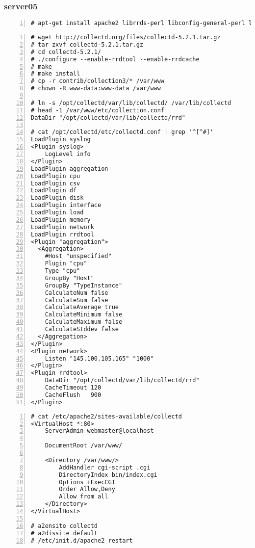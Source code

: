 \documentclass[Configuration]{subfiles}
\begin{document}
\newpage
\subsubsection{server05}

\begin{lstlisting}[frame=single,caption=Debian packages,backgroundcolor=\color{gray},breaklines=true,numbers=left,]
# apt-get install apache2 librrds-perl libconfig-general-perl libhtml-parser-perl libregexp-common-perl librrd2-dev rrdtool
\end{lstlisting}

\begin{lstlisting}[frame=single,caption=Collectd,backgroundcolor=\color{gray},breaklines=true,numbers=left,]
# wget http://collectd.org/files/collectd-5.2.1.tar.gz
# tar zxvf collectd-5.2.1.tar.gz
# cd collectd-5.2.1/
# ./configure --enable-rrdtool --enable-rrdcache
# make
# make install
# cp -r contrib/collection3/* /var/www
# chown -R www-data:www-data /var/www

# ln -s /opt/collectd/var/lib/collectd/ /var/lib/collectd
# head -1 /var/www/etc/collection.conf 
DataDir "/opt/collectd/var/lib/collectd/rrd"

# cat /opt/collectd/etc/collectd.conf | grep '^[^#]'
LoadPlugin syslog
<Plugin syslog>
    LogLevel info
</Plugin>
LoadPlugin aggregation
LoadPlugin cpu
LoadPlugin csv
LoadPlugin df
LoadPlugin disk
LoadPlugin interface
LoadPlugin load
LoadPlugin memory
LoadPlugin network
LoadPlugin rrdtool
<Plugin "aggregation">
  <Aggregation>
    #Host "unspecified"
    Plugin "cpu"
    Type "cpu"
    GroupBy "Host"
    GroupBy "TypeInstance"
    CalculateNum false
    CalculateSum false
    CalculateAverage true
    CalculateMinimum false
    CalculateMaximum false
    CalculateStddev false
  </Aggregation>
</Plugin>
<Plugin network>
    Listen "145.100.105.165" "1000"
</Plugin>
<Plugin rrdtool>
    DataDir "/opt/collectd/var/lib/collectd/rrd"
    CacheTimeout 120
    CacheFlush   900
</Plugin>
\end{lstlisting}

\begin{lstlisting}[frame=single,caption=Apache,backgroundcolor=\color{gray},breaklines=true,numbers=left,]
# cat /etc/apache2/sites-available/collectd 
<VirtualHost *:80>
    ServerAdmin webmaster@localhost

    DocumentRoot /var/www/

    <Directory /var/www/>
        AddHandler cgi-script .cgi
        DirectoryIndex bin/index.cgi
        Options +ExecCGI
        Order Allow,Deny
        Allow from all
    </Directory>
</VirtualHost> 

# a2ensite collectd
# a2dissite default
# /etc/init.d/apache2 restart
\end{lstlisting}
\end{document}
